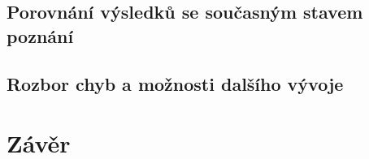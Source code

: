 \section{Porovnání výsledků se současným stavem poznání}


\section{Rozbor chyb a možnosti dalšího vývoje}




\chapter{Závěr}
\label{conclusion}


